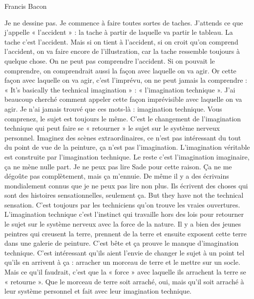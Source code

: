 \documentclass[a4paper, 12pt]{report}
\begin{document}
\vspace*{\fill}
\pagestyle{empty}
\begin{center}
		\Huge{Francis Bacon}
\end{center}
\vspace*{\fill}
Je ne dessine pas.
Je commence à faire toutes sortes de taches.
J’attends ce que j'appelle « l'accident » : la tache à partir de laquelle va partir le tableau.
La tache c’est l’accident.
Mais si on tient à l’accident, si on croit qu’on comprend l’accident, on va faire encore de l’illustration, car la tache ressemble toujours à quelque chose.
On ne peut pas comprendre l’accident.
Si on pouvait le comprendre, on comprendrait aussi la façon avec laquelle on va agir.
Or cette façon avec laquelle on va agir, c’est l’imprévu, on ne peut jamais la comprendre : « It’s basically the technical imagination » : « l’imagination technique ».
J’ai beaucoup cherché comment appeler cette façon imprévisible avec laquelle on va agir.
Je n’ai jamais trouvé que ces mots-là : imagination technique.
Vous comprenez, le sujet est toujours le même.
C’est le changement de l’imagination technique qui peut faire se « retourner » le sujet sur le système nerveux personnel.
Imaginez des scènes extraordinaires, ce n’est pas intéressant du tout du point de vue de la peinture, ça n’est pas l’imagination.
L’imagination véritable est construite par l’imagination technique.
Le reste c’est l’imagination imaginaire, ça ne mène nulle part.
Je ne peux pas lire Sade pour cette raison.
Ça ne me dégoûte pas complètement, mais ça m’ennuie.
De même il y a des écrivains mondialement connus que je ne peux pas lire non plus.
Ils écrivent des choses qui sont des histoires sensationnelles, seulement ça.
But they have not the technical sensation.
C’est toujours par les techniciens qu’on trouve les vraies ouvertures.
L’imagination technique c’est l’instinct qui travaille hors des lois pour retourner le sujet sur le système nerveux avec la force de la nature.
Il y a bien des jeunes peintres qui creusent la terre, prennent de la terre et ensuite exposent cette terre dans une galerie de peinture.
C’est bête et ça prouve le manque d’imagination technique.
C’est intéressant qu’ils aient l’envie de changer le sujet à un point tel qu’ils en arrivent à ça : arracher un morceau de terre et le mettre sur un socle.
Mais ce qu’il faudrait, c’est que la « force » avec laquelle ils arrachent la terre se « retourne ».
Que le morceau de terre soit arraché, oui, mais qu’il soit arraché à leur système personnel et fait avec leur imagination technique.
\vspace*{\fill}
\end{document}
